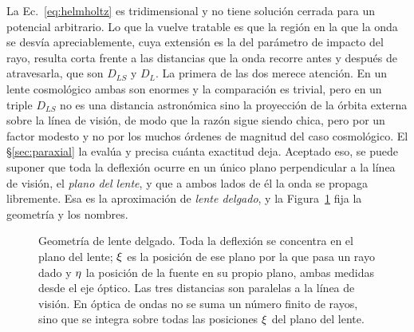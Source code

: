 \documentclass[11pt,a4paper,openany]{book}
\begin{document}
La Ec.~\eqref{eq:helmholtz} es tridimensional y no tiene soluci\'on cerrada
para un potencial arbitrario. Lo que la vuelve tratable es que la regi\'on en
la que la onda se desv\'ia apreciablemente, cuya extensi\'on es la del
par\'ametro de impacto del rayo, resulta corta frente a las distancias que la
onda recorre antes y despu\'es de atravesarla, que son $D_{LS}$ y $D_L$. La
primera de las dos merece atenci\'on. En un lente cosmol\'ogico ambas son
enormes y la comparaci\'on es trivial, pero en un triple $D_{LS}$ no es una
distancia astron\'omica sino la proyecci\'on de la \'orbita externa sobre la
l\'inea de visi\'on, de modo que la raz\'on sigue siendo chica, pero por un
factor modesto y no por los muchos \'ordenes de magnitud del caso
cosmol\'ogico. El \S\ref{sec:paraxial} la eval\'ua y precisa cu\'anta
exactitud deja. Aceptado eso, se puede suponer que toda la deflexi\'on ocurre
en un \'unico plano perpendicular a la l\'inea de visi\'on, el \emph{plano del
lente}, y que a ambos lados de \'el la onda se propaga libremente. Esa es la
aproximaci\'on de \emph{lente delgado}, y la Figura~\ref{fig:lensgeom} fija la
geometr\'ia y los nombres.

\begin{figure}[htbp]
\centering
{}
\caption{Geometr\'ia de lente delgado. Toda la deflexi\'on se concentra en el
plano del lente; $\vb\xi$ es la posici\'on de ese plano por la que pasa un
rayo dado y $\vb\eta$ la posici\'on de la fuente en su propio plano, ambas
medidas desde el eje \'optico. Las tres distancias son paralelas a la l\'inea
de visi\'on. En \'optica de ondas no se suma un n\'umero finito de rayos, sino
que se integra sobre todas las posiciones $\vb\xi$ del plano del lente.}
\label{fig:lensgeom}
\end{figure}
\end{document}
